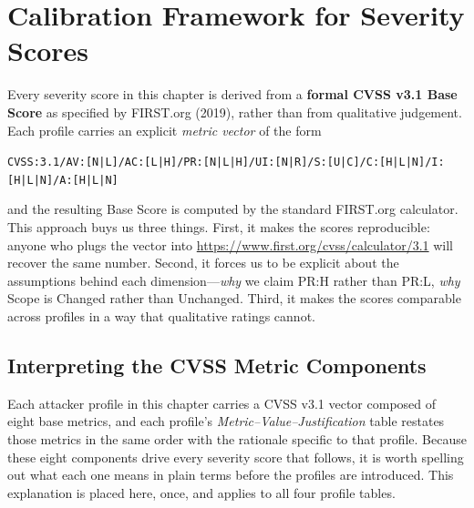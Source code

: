 \documentclass[a4paper,12pt]{report}
\newcommand{\cvssvec}[1]{\texttt{\small #1}}
\begin{document}
\section{Calibration Framework for Severity Scores}
\label{sec:cvss-framework}

Every severity score in this chapter is derived from a \textbf{formal CVSS
v3.1 Base Score} as specified by FIRST.org (2019), rather than from qualitative
judgement. Each profile carries an explicit \emph{metric vector} of the form

\begin{center}
\cvssvec{CVSS:3.1/AV:[N|L]/AC:[L|H]/PR:[N|L|H]/UI:[N|R]/S:[U|C]/C:[H|L|N]/I:[H|L|N]/A:[H|L|N]}
\end{center}

and the resulting Base Score is computed by the standard FIRST.org
calculator. This approach buys us three things. First, it makes the
scores reproducible: anyone who plugs the vector into
\url{https://www.first.org/cvss/calculator/3.1} will recover the same
number. Second, it forces us to be explicit about the assumptions behind
each dimension---\emph{why} we claim PR:H rather than PR:L, \emph{why}
Scope is Changed rather than Unchanged. Third, it makes the scores
comparable across profiles in a way that qualitative ratings cannot.

\subsection{Interpreting the CVSS Metric Components}
\label{sec:cvss-metrics-explained}

Each attacker profile in this chapter carries a CVSS v3.1 vector composed
of eight base metrics, and each profile's \emph{Metric--Value--Justification}
table restates those metrics in the same order with the rationale specific
to that profile. Because these eight components drive every severity score
that follows, it is worth spelling out what each one means in plain terms
before the profiles are introduced. This explanation is placed here, once,
and applies to all four profile tables.
\end{document}
